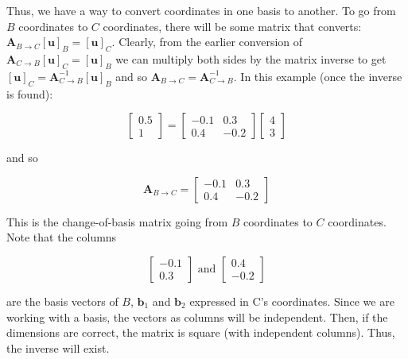 \documentclass[main.tex]{subfiles}
\begin{document}
    Thus, we have a way to convert coordinates in one basis to another. To go from $B$ coordinates to $C$ coordinates, there will be some matrix that converts: $\mathbf{A}_{B \rightarrow C}[\mathbf{u}]_{B}=[\mathbf{u}]_{C}$. Clearly, from the earlier conversion of $\mathbf{A}_{C \rightarrow B}[\mathbf{u}]_{C}=[\mathbf{u}]_{B}$ we can multiply both sides by the matrix inverse to get $[\mathbf{u}]_{C}=\mathbf{A}_{C \rightarrow B}^{-1}[\mathbf{u}]_{B}$ and so $\mathbf{A}_{B \rightarrow C}=\mathbf{A}_{C \rightarrow B}^{-1}$. In this example (once the inverse is found): 
    
    $$
    \left[\begin{array}{r}
    0.5 \\
    1
    \end{array}\right]=\left[\begin{array}{cc}
    -0.1 & 0.3 \\
    0.4 & -0.2
    \end{array}\right]\left[\begin{array}{l}
    4 \\
    3
    \end{array}\right]
    $$
    
    and so
    
    $$
    \mathbf{A}_{B \rightarrow C}=\left[\begin{array}{cc}
    -0.1 & 0.3 \\
    0.4 & -0.2
    \end{array}\right]
    $$

    This is the change-of-basis matrix going from $B$ coordinates to $C$ coordinates. Note that the columns 
    
    $$
    \left[\begin{array}{r}
    -0.1 \\
    0.3
    \end{array}\right] \text { and }\left[\begin{array}{r}
    0.4 \\
    -0.2
    \end{array}\right]
    $$
    
    are the basis vectors of $B$, $\mathbf{b}_{1}$ and $\mathbf{b}_{2}$ expressed in C's coordinates. Since we are working with a basis, the vectors as columns will be independent. Then, if the dimensions are correct, the matrix is square (with independent columns). Thus, the inverse will exist.\\
    
\end{document}
